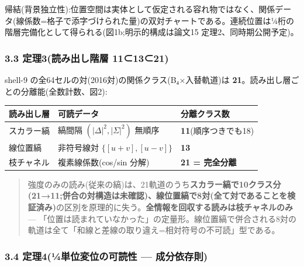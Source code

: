 \documentclass[
]{ltjsarticle}
\newcounter{none} %
\begin{document}
帰結(背景独立性):位置空間は実体として仮定される容れ物ではなく、関係データ(線係数=格子で添字づけられた量)の双対チャートである。連続位置は¼桁の階層完備化として得られる(図1b;明示的構成は論文15
定理2、同時期公開予定)。

\subsubsection{3.3 定理3(読み出し階層
11⊂13⊂21)}\label{ux5b9aux74063ux8aadux307fux51faux3057ux968eux5c64-111321}

shell-9 の全64セルの対(2016対)の関係クラス(B₄×入替軌道)は
\textbf{21}。読み出し層ごとの分離能(全数計数、図2):

{\def\LTcaptype{none} %
\begin{longtable}[]{@{}
  >{\raggedright\arraybackslash}p{}
  >{\raggedright\arraybackslash}p{}
  >{\raggedright\arraybackslash}p{}@{}}
\toprule\noalign{}
\begin{minipage}[b]{\linewidth}\raggedright
読み出し層
\end{minipage} & \begin{minipage}[b]{\linewidth}\raggedright
可読データ
\end{minipage} & \begin{minipage}[b]{\linewidth}\raggedright
分離クラス数
\end{minipage} \\
\midrule\noalign{}
\endhead
\bottomrule\noalign{}
\endlastfoot
スカラー縞 & 縞間隔 \((|\Delta|^2,|\Sigma|^2)\) 無順序 &
\textbf{11}(順序つきでも18) \\
線位置縞 & 非符号線対 \(\{[u{+}v],[u{-}v]\}\) & \textbf{13} \\
枝チャネル & 複素線係数(cos/sin 分解) & \textbf{21 = 完全分離} \\
\end{longtable}
}

\begin{quote}
強度のみの読み(従来の縞)は、21軌道のうち\textbf{スカラー縞で10クラス分(21→11;併合の対構造は未確認)、線位置縞で8対(全て対であることを検証済み)}の区別を原理的に失う。\textbf{全情報を回収する読みは枝チャネルのみ}
---
「位置は読まれていなかった」の定量形。線位置縞で併合される8対の軌道は全て「和線と差線の取り違え=相対符号の不可読」型である。
\end{quote}

\subsubsection{3.4 定理4(¼単位変位の可読性 ---
成分依存則)}\label{ux5b9aux74064uxbcux5358ux4f4dux5909ux4f4dux306eux53efux8aadux6027-ux6210ux5206ux4f9dux5b58ux5247}
\end{document}
